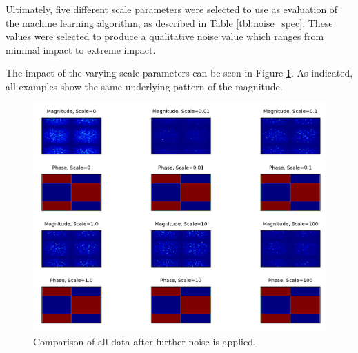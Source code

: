 \documentclass[conference]{IEEEtran}
\begin{document}
Ultimately, five different scale parameters were selected to use as evaluation of the machine learning algorithm, as described in Table \ref{tbl:noise_spec}.
These values were selected to produce a qualitative noise value which ranges from minimal impact to extreme impact.
\begin{table}
	\centering
	\caption{Selected Scale Parameter Values for Evaluation.}
	\setlength\extrarowheight{2pt}
	\label{tbl:noise_spec}
\end{table}

The impact of the varying scale parameters can be seen in Figure \ref{fig:noise_comparison}. 
As indicated, all examples show the same underlying pattern of the magnitude.

\begin{figure}
	\centering
	\includegraphics[width=1\linewidth]{images/noise_comparison}
	\caption{Comparison of all data after further noise is applied.}
	\label{fig:noise_comparison}
\end{figure}
\end{document}
